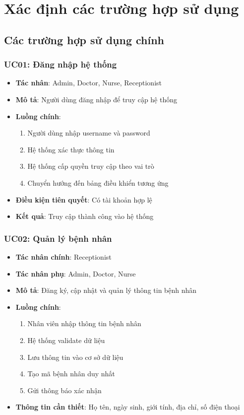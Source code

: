 \documentclass[12pt,a4paper]{report}
\begin{document}
    \section{Xác định các trường hợp sử dụng}

    \subsection{Các trường hợp sử dụng chính}

    \subsubsection{UC01: Đăng nhập hệ thống}
    \begin{itemize}
        \item \textbf{Tác nhân}: Admin, Doctor, Nurse, Receptionist
        \item \textbf{Mô tả}: Người dùng đăng nhập để truy cập hệ thống
        \item \textbf{Luồng chính}:
        \begin{enumerate}
            \item Người dùng nhập username và password
            \item Hệ thống xác thực thông tin
            \item Hệ thống cấp quyền truy cập theo vai trò
            \item Chuyển hướng đến bảng điều khiển tương ứng
        \end{enumerate}
        \item \textbf{Điều kiện tiên quyết}: Có tài khoản hợp lệ
        \item \textbf{Kết quả}: Truy cập thành công vào hệ thống
    \end{itemize}

    \subsubsection{UC02: Quản lý bệnh nhân}
    \begin{itemize}
        \item \textbf{Tác nhân chính}: Receptionist
        \item \textbf{Tác nhân phụ}: Admin, Doctor, Nurse
        \item \textbf{Mô tả}: Đăng ký, cập nhật và quản lý thông tin bệnh nhân
        \item \textbf{Luồng chính}:
        \begin{enumerate}
            \item Nhân viên nhập thông tin bệnh nhân
            \item Hệ thống validate dữ liệu
            \item Lưu thông tin vào cơ sở dữ liệu
            \item Tạo mã bệnh nhân duy nhất
            \item Gửi thông báo xác nhận
        \end{enumerate}
        \item \textbf{Thông tin cần thiết}: Họ tên, ngày sinh, giới tính, địa chỉ, số điện thoại
    \end{itemize}
\end{document}
